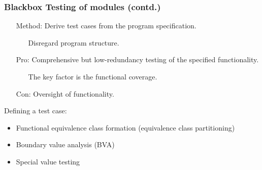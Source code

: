 
\begin{frame}
\frametitle{Blackbox Testing of modules (contd.)}

\begin{enumerate}[align=parleft]
  \item [Method:] Derive test cases from the program specification.
  \begin{itemize}
  \item [] Disregard program structure.
  \end{itemize}
  \item [Pro:] Comprehensive but low-redundancy testing of the specified functionality.
  \begin{itemize}
  \item [] The key factor is the functional coverage.
  \end{itemize}
  \item [Con:] Oversight of functionality.
\end{enumerate}
\begin{block}{Defining a test case:}
    \begin{itemize}
      \item Functional equivalence class formation (equivalence class partitioning)
      \item Boundary value analysis (BVA)
      \item Special value testing
    \end{itemize}
\end{block}
\end{frame}